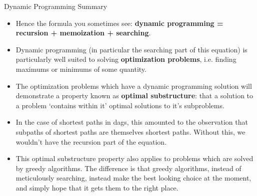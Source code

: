 \documentclass{beamer}
\begin{document}
\begin{frame}{Dynamic Programming Summary}
    \begin{itemize}
        \item Hence the formula you sometimes see: \textbf{dynamic programming = recursion + memoization + searching}. 
        \item Dynamic programming (in particular the searching part of this equation) is particularly well suited to solving \textbf{optimization problems}, i.e. finding maximums or minimums of some quantity. 
        \item The optimization problems which have a dynamic programming solution will demonstrate a property known as \textbf{optimal substructure}: that a solution to a problem `contains within it' optimal solutions to it's subproblems. \pause 
        \item In the case of shortest paths in dags, this amounted to the observation that subpaths of shortest paths are themselves shortest paths. Without this, we wouldn't have the recursion part of the equation. \pause 
        \item This optimal substructure property also applies to problems which are solved by greedy algorithms. The difference is that greedy algorithms, instead of meticulously searching, instead make the best looking choice at the moment, and simply hope that it gets them to the right place. 
    \end{itemize}
\end{frame}
\end{document}
